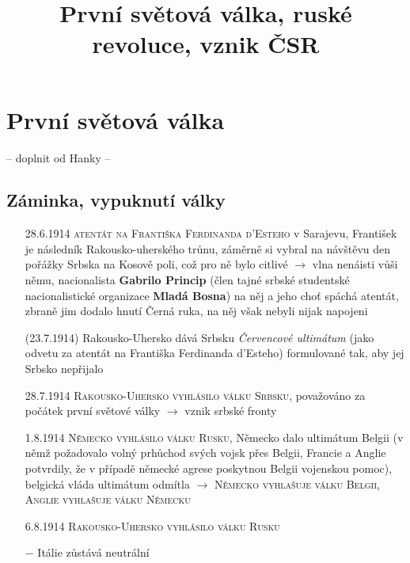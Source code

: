 \documentclass{article}
\title{\vspace{-2cm}První světová válka, ruské revoluce, vznik ČSR\vspace{-1.7cm}}
\date{}
\author{}
\begin{document}
\maketitle

\section*{První světová válka}

-- doplnit od Hanky --

\subsection*{Záminka, vypuknutí války}
\begin{itemize}
    \vspace{-0.5em}
    \setlength\itemsep{0.15em}
    \item[28.6.1914] \textsc{atentát na Františka Ferdinanda d'Esteho} v Sarajevu, František je následník Rakousko-uherského trůnu, záměrně si vybral na návštěvu den pořážky Srbska na Kosově poli, což pro ně bylo citlivé $\rightarrow$ vlna nenáisti vůši němu, nacionalista \textbf{Gabrilo Princip} (člen tajné srbské studentské nacionalistické organizace \textbf{Mladá Bosna}) na něj a jeho choť spáchá atentát, zbraně jim dodalo hnutí Černá ruka, na něj však nebyli nijak napojeni
    \item[(23.7.1914)] Rakousko-Uhersko dává Srbsku \textit{Červencové ultimátum}  (jako odvetu za atentát na Františka Ferdinanda d'Esteho) formulované tak, aby jej Srbsko nepřijalo
    \item[28.7.1914] \textsc{Rakousko-Uhersko vyhlásilo válku Srbsku}, považováno za počátek první světové války $\rightarrow$ vznik srbské fronty
    \item[1.8.1914] \textsc{Německo vyhlásilo válku Rusku}, Německo dalo ultimátum Belgii (v němž požadovalo volný prhůchod svých vojsk přes Belgii, Francie a Anglie potvrdily, že v případě německé agrese poskytnou Belgii vojenskou pomoc), belgická vláda ultimátum odmítla $\rightarrow$ \textsc{Německo vyhlašuje válku Belgii}, \textsc{Anglie vyhlašuje válku Německu}
    \item[6.8.1914] \textsc{Rakousko-Uhersko vyhlásilo válku Rusku}
    \item[$-$] Itálie zůstává neutrální
\end{itemize}
\end{document}
